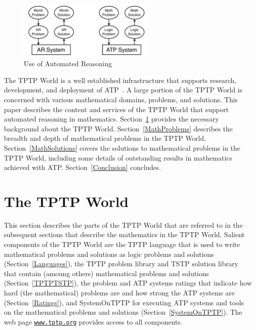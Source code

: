 \documentclass[runningheads]{llncs}
\begin{document}
\begin{figure}[htb]
\centering
\includegraphics[width=0.6\textwidth]{UseOfAR.pdf}
\vspace*{-1em}
\caption{Use of Automated Reasoning}
\label{UseOfAR}
\end{figure}

The TPTP World is a well established infrastructure that supports research, development, and 
deployment of ATP~\cite{Sut10,Sut17}.
A large portion of the TPTP World is concerned with various mathematical domains, problems, and
solutions.
This paper describes the content and services of the TPTP World that support automated reasoning
in mathematics.
Section~\ref{TPTPWorld} provides the necessary background about the TPTP World.
Section~\ref{MathProblems} describes the breadth and depth of mathematical problems in the TPTP
World.
Section~\ref{MathSolutions} covers the solutions to mathematical problems in the TPTP World,
including some details of outstanding results in mathematics achieved with ATP.
Section~\ref{Conclusion} concludes.

\section{The TPTP World}
\label{TPTPWorld}

This section describes the parts of the TPTP World that are referred to in the subsequent sections 
that describe the mathematics in the TPTP World.
Salient components of the TPTP World are
the TPTP language that is used to write mathematical problems and solutions as logic problems and 
solutions (Section~\ref{Languages}),
the TPTP problem library and TSTP solution library that contain (amoung others) mathematical
problems and solutions (Section~\ref{TPTPTSTP}),
the problem and ATP systems ratings that indicate how hard (the mathematical) problems are and 
how strong the ATP systems are (Section~\ref{Ratings}),
and SystemOnTPTP for executing ATP systems and tools on the mathematical problems and solutions
(Section~\ref{SystemOnTPTP}).
The web page \href{http://www.tptp.org}{{\tt www.tptp.org}} provides access to all components.
\end{document}
